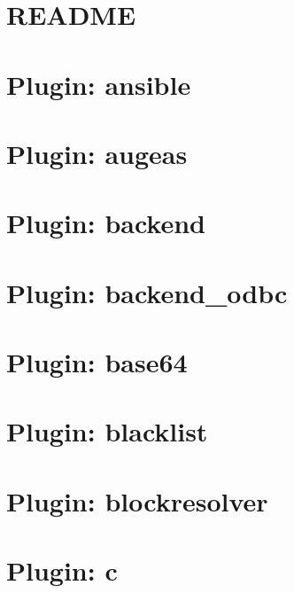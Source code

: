 \let\mypdfximage\pdfximage\def\pdfximage{\immediate\mypdfximage}\documentclass[twoside]{book}
\newcommand{\+}{\discretionary{\mbox{\scriptsize$\hookleftarrow$}}{}{}}
\begin{document}
\chapter{README}
\label{md_src_bindings_io_doc_README}

\chapter{Plugin\+: ansible}
\label{md_src_plugins_ansible_README}

\chapter{Plugin\+: augeas}
\label{md_src_plugins_augeas_README}

\chapter{Plugin\+: backend}
\label{md_src_plugins_backend_README}

\chapter{Plugin\+: backend\+\_\+odbc}
\label{md_src_plugins_backend_odbc_README}

\chapter{Plugin\+: base64}
\label{md_src_plugins_base64_README}

\chapter{Plugin\+: blacklist}
\label{md_src_plugins_blacklist_README}

\chapter{Plugin\+: blockresolver}
\label{md_src_plugins_blockresolver_README}

\chapter{Plugin\+: c}
\label{md_src_plugins_c_README}

\end{document}
